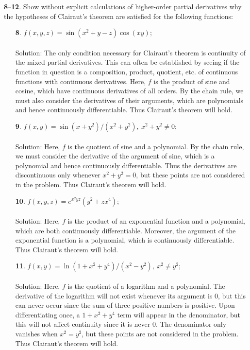 \documentclass[12pt]{amsbook}
\begin{document}
\noindent
{\small {\bf 8}--{\bf 12}}. Show without explicit calculations of higher-order partial derivatives
why the hypotheses of Clairaut’s theorem are satisfied for the following
functions:
\begin{enumerate}
\item[{\small\bf 8}.] $f(x,y,z)=\sin(x^2+y-z)\cos(xy)$;
\\
\\
{\sc Solution}: The only condition necessary for Clairaut's theorem is continuity of the mixed partial derivatives. This can often be established by seeing if the function in question is a composition, product, quotient, etc. of continuous functions with continuous derivatives. Here, $f$ is the product of sine and cosine, which have continuous derivatives of all orders. By the chain rule, we must also consider the derivatives of their arguments, which are polynomials and hence continuously differentiable. Thus Clairaut's theorem will hold. 
\\
\item[{\small\bf 9}.] $f(x,y)=\sin(x+y^2)/(x^2+y^2), \ x^2+y^2\neq 0$;
\\
\\
{\sc Solution}: Here, $f$ is the quotient of sine and a polynomial. By the chain rule, we must consider the derivative of the argument of sine, which is a polynomial and hence continuously differentiable. Thus the derivatives are discontinuous only whenever $x^2+y^2=0$, but these points are not considered in the problem. Thus Clairaut's theorem will hold. 
\\
\item[{\small\bf 10}.] $f(x,y,z)=e^{x^2yz}(y^2+zx^4)$;
\\
\\
{\sc Solution}: Here, $f$ is the product of an exponential function and a polynomial, which are both continuously differentiable. Moreover, the argument of the exponential function is a polynomial, which is continuously differentiable. Thus Clairaut's theorem will hold. 
\\
\item[{\small\bf 11}.] $f(x,y)=\ln(1+x^2+y^4)/(x^2-y^2), \ x^2\neq y^2$;
\\
\\
{\sc Solution}: Here, $f$ is the quotient of a logarithm and a polynomial. The derivative of the logarithm will not exist whenever its argument is $0$, but this can never occur since the sum of three positive numbers is positive. Upon differentiating once, a $1+x^2+y^4$ term will appear in the denominator, but this will not affect continuity since it is never $0$. The denominator only vanishes when $x^2=y^2$, but these points are not considered in the problem. Thus Clairaut's theorem will hold. 

\end{enumerate}
\end{document}
